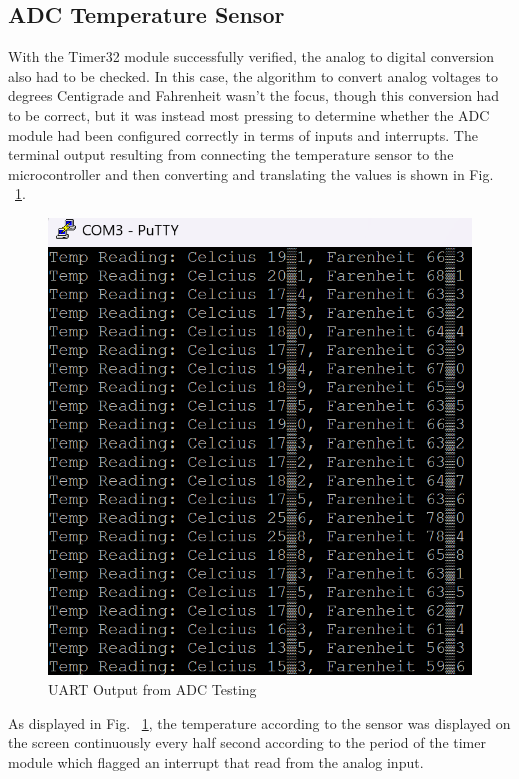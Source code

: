 \documentclass[conference]{IEEEtran}
\begin{document}

\subsection{ADC Temperature Sensor}

With the Timer32 module successfully verified, the analog to digital conversion also had to be checked. In this case, the algorithm to convert analog voltages to degrees Centigrade and Fahrenheit wasn't the focus, though this conversion had to be correct, but it was instead most pressing to determine whether the ADC module had been configured correctly in terms of inputs and interrupts. The terminal output resulting from connecting the temperature sensor to the microcontroller and then converting and translating the values is shown in Fig. ~\ref{part2terminal}.

\begin{figure}
    \centering
    \includegraphics[width=\linewidth,decodearray={1 0 1 0 1 0}]{images/part2terminal2.png}
    \caption{UART Output from ADC Testing}
    \label{part2terminal}
\end{figure}

As displayed in Fig. ~\ref{part2terminal}, the temperature according to the sensor was displayed on the screen continuously every half second according to the period of the timer module which flagged an interrupt that read from the analog input.
\end{document}
